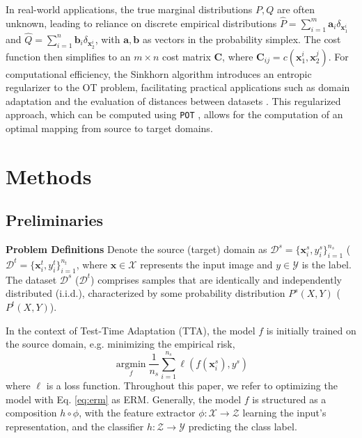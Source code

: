 \documentclass[11pt,a4paper]{article}
\begin{document}
In real-world applications, the true marginal distributions $P, Q$ are often unknown, leading to reliance on discrete empirical distributions $\hat{P}=\sum_{i=1}^{m}\mathbf{a}_i\delta_{\mathbf{x}_1^i}$ and $\hat{Q}=\sum_{i=1}^{n}\mathbf{b}_i\delta_{\mathbf{x}_2^i}$, with $\mathbf{a},\mathbf{b}$ as vectors in the probability simplex. 
The cost function then simplifies to an $m \times n$ cost matrix $\mathbf{C}$, where $\mathbf{C}_{ij} = c(\mathbf{x}_1^i, \mathbf{x}_2^j)$. 
For computational efficiency, the Sinkhorn algorithm \cite{cuturi2013sinkhorn} introduces an entropic regularizer to the OT problem, facilitating practical applications such as domain adaptation \cite{courty2016optimal} and the evaluation of distances between datasets \cite{alvarez2020geometric}. 
This regularized approach, which can be computed using \verb|POT| \cite{flamary2021pot}, allows for the computation of an optimal mapping from source to target domains.


\section{Methods}

\subsection{Preliminaries}
\label{problem_setup_preliminaries}
\textbf{Problem Definitions} Denote the source (target) domain as $\mathcal{D}^s=\{\mathbf{x}_i^s, y_i^s\}_{i=1}^{n_s}$ ($\mathcal{D}^t=\{\mathbf{x}_i^t, y_i^t\}_{i=1}^{n_t}$, where $\mathbf{x} \in \mathcal{X}$ represents the input image and $y\in \mathcal{Y}$ is the label.
The dataset $\mathcal{D}^s$ ($\mathcal{D}^t$) comprises samples that are identically and independently distributed (i.i.d.), characterized by some probability distribution $P^s(X, Y)$ ($P^t(X, Y)$).

In the context of Test-Time Adaptation (TTA), the model $f$ is initially trained on the source domain, e.g. minimizing the empirical risk, 
\begin{equation}
\label{eq:erm}
    \mathop{\arg \min}\limits_{f} \frac{1}{n_s} \sum_{i=1}^{n_s} \ell(f(\mathbf{x}_i^s), y^s)
\end{equation}
where $\ell$ is a loss function. Throughout this paper, we refer to optimizing the model with Eq. \ref{eq:erm} as ERM. 
Generally, the model $f$ is structured as a composition $h \circ \phi$, with the feature extractor $\phi: \mathcal{X} \rightarrow \mathcal{Z}$ learning the input's representation, and the classifier $h: \mathcal{Z} \rightarrow \mathcal{Y}$ predicting the class label. 
\end{document}
